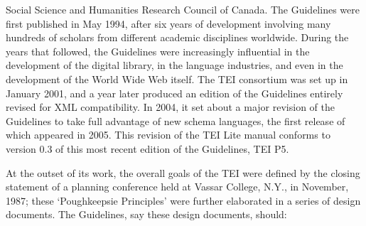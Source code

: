 \documentclass[11pt,twoside]{article}\makeatletter
\begin{document}
        Social Science and Humanities Research Council of Canada. The
        Guidelines were first published in May 1994, after six years
        of development involving many hundreds of scholars from
        different academic disciplines worldwide. During the years
        that followed, the Guidelines were increasingly influential in
        the development of the digital library, in the language
        industries, and even in the development of the World Wide Web
        itself. The TEI consortium was set up in January 2001, and a
        year later produced an  edition of the
        Guidelines entirely revised for XML
        compatibility. In 2004, it set about a major revision of the
	Guidelines to take full advantage of new schema
	languages, the first release of which appeared in 2005. This
	revision of the TEI Lite manual conforms to version 0.3 of
	this most recent edition of the Guidelines, TEI P5.\par At the outset of its work, the overall goals of the TEI
        were defined by the closing statement of a planning conference
        held at Vassar College, N.Y., in November, 1987; these
        ‘Poughkeepsie Principles’ were further
        elaborated in a series of design documents.  The Guidelines,
        say these design documents, should:
\end{document}
